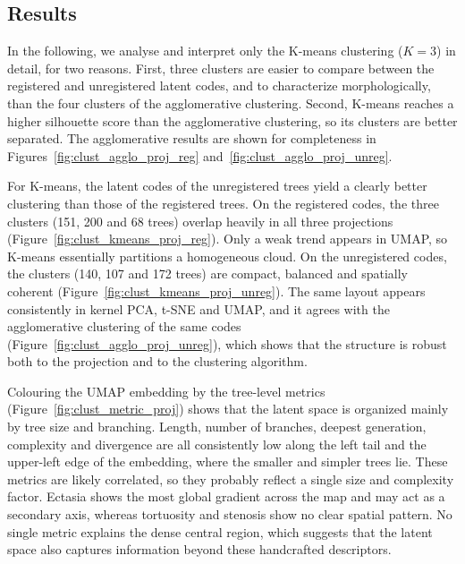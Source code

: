 \newcommand{\projwidth}{0.86\linewidth}  %

\subsection{Results}                     %
\label{sec:clust_results}                %

In the following, we analyse and interpret only the K-means clustering ($K=3$) in detail,
for two reasons. First, three clusters are easier to compare between the registered and
unregistered latent codes, and to characterize morphologically, than the four clusters of the
agglomerative clustering. Second, K-means reaches a higher silhouette score than the
agglomerative clustering, so its clusters are better separated. The agglomerative results are
shown for completeness in Figures~\ref{fig:clust_agglo_proj_reg}
and~\ref{fig:clust_agglo_proj_unreg}.

For K-means, the latent codes of the unregistered trees yield a clearly better clustering than
those of the registered trees. On the registered codes, the three clusters (151, 200 and 68
trees) overlap heavily in all three projections (Figure~\ref{fig:clust_kmeans_proj_reg}). Only a
weak trend appears in UMAP, so K-means essentially partitions a homogeneous cloud. On the
unregistered codes, the clusters (140, 107 and 172 trees) are compact, balanced and spatially
coherent (Figure~\ref{fig:clust_kmeans_proj_unreg}). The same layout appears consistently in
kernel PCA, t-SNE and UMAP, and it agrees with the agglomerative clustering of the same codes
(Figure~\ref{fig:clust_agglo_proj_unreg}), which shows that the structure is robust both to the
projection and to the clustering algorithm.

Colouring the UMAP embedding by the tree-level metrics (Figure~\ref{fig:clust_metric_proj})
shows that the latent space is organized mainly by tree size and branching. Length, number of
branches, deepest generation, complexity and divergence are all consistently low along the left
tail and the upper-left edge of the embedding, where the smaller and simpler trees lie. These
metrics are likely correlated, so they probably reflect a single size and complexity factor.
Ectasia shows the most global gradient across the map and may act as a secondary axis, whereas
tortuosity and stenosis show no clear spatial pattern. No single metric explains the dense
central region, which suggests that the latent space also captures information beyond these
handcrafted descriptors.

